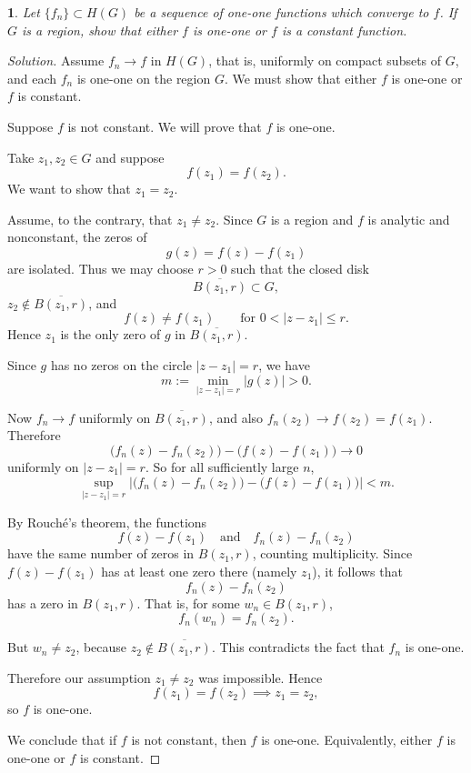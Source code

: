 \documentclass[12pt, a4paper]{report}
\theoremstyle{spaced}
\newtheorem{exercise}{}
\newcommand{\setexercise}[1]{\setcounter{exercise}{#1-1}}
\begin{document}
\setexercise{10}
\begin{exercise}
	Let $\{f_n\}\subset H(G)$ be a sequence of one-one functions which converge
	to $f$. If $G$ is a region, show that either $f$ is one-one or $f$ is a
	constant function.
\end{exercise}
\begin{proof}[Solution]
	Assume \(f_n \to f\) in \(H(G)\), that is, uniformly on compact subsets of \(G\), and each \(f_n\) is one-one on the region \(G\). We must show that either \(f\) is one-one or \(f\) is constant.

	Suppose \(f\) is not constant. We will prove that \(f\) is one-one.

	Take \(z_1,z_2\in G\) and suppose
	\[
		f(z_1)=f(z_2).
	\]
	We want to show that \(z_1=z_2\).

	Assume, to the contrary, that \(z_1\neq z_2\). Since \(G\) is a region and \(f\) is analytic and nonconstant, the zeros of
	\[
		g(z)=f(z)-f(z_1)
	\]
	are isolated. Thus we may choose \(r>0\) such that the closed disk
	\[
		\overline{B(z_1,r)}\subset G,
	\]
	\(z_2\notin \overline{B(z_1,r)}\), and
	\[
		f(z)\neq f(z_1)\qquad \text{for } 0<|z-z_1|\le r.
	\]
	Hence \(z_1\) is the only zero of \(g\) in \(\overline{B(z_1,r)}\).

	Since \(g\) has no zeros on the circle \(|z-z_1|=r\), we have
	\[
		m:=\min_{|z-z_1|=r}|g(z)|>0.
	\]

	Now \(f_n\to f\) uniformly on \(\overline{B(z_1,r)}\), and also \(f_n(z_2)\to f(z_2)=f(z_1)\). Therefore
	\[
		\bigl(f_n(z)-f_n(z_2)\bigr)-\bigl(f(z)-f(z_1)\bigr)\to 0
	\]
	uniformly on \(|z-z_1|=r\). So for all sufficiently large \(n\),
	\[
		\sup_{|z-z_1|=r}\left|\bigl(f_n(z)-f_n(z_2)\bigr)-\bigl(f(z)-f(z_1)\bigr)\right|<m.
	\]

	By Rouch\'e's theorem, the functions
	\[
		f(z)-f(z_1)
		\quad\text{and}\quad
		f_n(z)-f_n(z_2)
	\]
	have the same number of zeros in \(B(z_1,r)\), counting multiplicity. Since \(f(z)-f(z_1)\) has at least one zero there (namely \(z_1\)), it follows that
	\[
		f_n(z)-f_n(z_2)
	\]
	has a zero in \(B(z_1,r)\). That is, for some \(w_n\in B(z_1,r)\),
	\[
		f_n(w_n)=f_n(z_2).
	\]

	But \(w_n\neq z_2\), because \(z_2\notin \overline{B(z_1,r)}\). This contradicts the fact that \(f_n\) is one-one.

	Therefore our assumption \(z_1\neq z_2\) was impossible. Hence
	\[
		f(z_1)=f(z_2)\implies z_1=z_2,
	\]
	so \(f\) is one-one.

	We conclude that if \(f\) is not constant, then \(f\) is one-one. Equivalently, either \(f\) is one-one or \(f\) is constant.
\end{proof}
\end{document}
